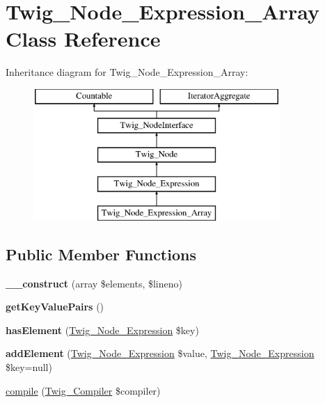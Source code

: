 \hypertarget{classTwig__Node__Expression__Array}{}\section{Twig\+\_\+\+Node\+\_\+\+Expression\+\_\+\+Array Class Reference}
\label{classTwig__Node__Expression__Array}
Inheritance diagram for Twig\+\_\+\+Node\+\_\+\+Expression\+\_\+\+Array\+:\begin{figure}[H]
\begin{center}
\leavevmode
\includegraphics[height=5.000000cm]{classTwig__Node__Expression__Array}
\end{center}
\end{figure}
\subsection*{Public Member Functions}
\begin{DoxyCompactItemize}
\item 
{\bfseries \+\_\+\+\_\+construct} (array \$elements, \$lineno)\hypertarget{classTwig__Node__Expression__Array_a9656b7c9b6f602bc3a55fffd24b56211}{}\label{classTwig__Node__Expression__Array_a9656b7c9b6f602bc3a55fffd24b56211}

\item 
{\bfseries get\+Key\+Value\+Pairs} ()\hypertarget{classTwig__Node__Expression__Array_a8d8a6f61d6a1c5392135e63bb9970de4}{}\label{classTwig__Node__Expression__Array_a8d8a6f61d6a1c5392135e63bb9970de4}

\item 
{\bfseries has\+Element} (\hyperlink{classTwig__Node__Expression}{Twig\+\_\+\+Node\+\_\+\+Expression} \$key)\hypertarget{classTwig__Node__Expression__Array_a2b2da8c6b618536109bbc0063363cffa}{}\label{classTwig__Node__Expression__Array_a2b2da8c6b618536109bbc0063363cffa}

\item 
{\bfseries add\+Element} (\hyperlink{classTwig__Node__Expression}{Twig\+\_\+\+Node\+\_\+\+Expression} \$value, \hyperlink{classTwig__Node__Expression}{Twig\+\_\+\+Node\+\_\+\+Expression} \$key=null)\hypertarget{classTwig__Node__Expression__Array_ab709d8bc8d2ad22c055025243eb52ea7}{}\label{classTwig__Node__Expression__Array_ab709d8bc8d2ad22c055025243eb52ea7}

\item 
\hyperlink{classTwig__Node__Expression__Array_aee35a1d21bfd56bdf065c24501a44235}{compile} (\hyperlink{classTwig__Compiler}{Twig\+\_\+\+Compiler} \$compiler)
\end{DoxyCompactItemize}
